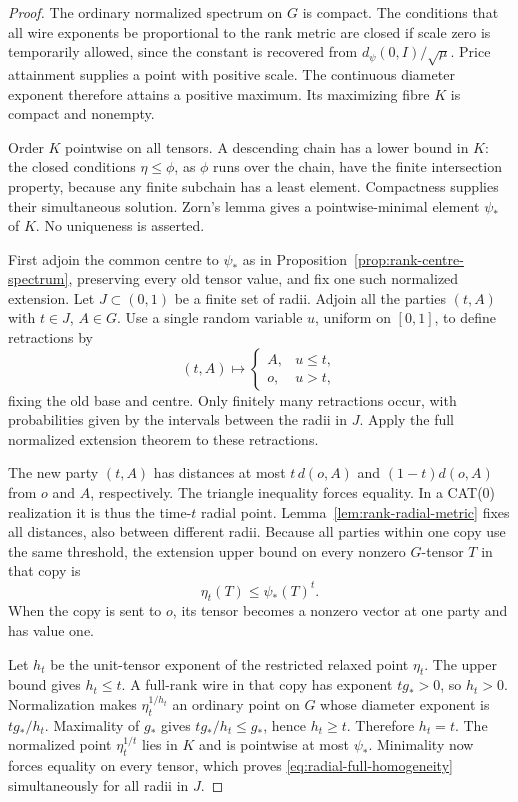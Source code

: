 \begin{proof}
The ordinary normalized spectrum on $G$ is compact. The conditions
that all wire exponents be proportional to the rank metric are
closed if scale zero is temporarily allowed, since the constant is recovered from
$d_\psi(0,I)/\sqrt\mu$. Price attainment supplies a point with
positive scale. The continuous diameter exponent therefore attains
a positive maximum. Its maximizing fibre $K$ is compact and
nonempty.

Order $K$ pointwise on all tensors. A descending chain has a lower
bound in $K$: the closed conditions $\eta\le\phi$, as $\phi$
runs over the chain, have the finite intersection property, because
any finite subchain has a least element. Compactness supplies their
simultaneous solution. Zorn's lemma gives a pointwise-minimal
element $\psi_*$ of $K$. No uniqueness is asserted.

First adjoin the common centre to $\psi_*$ as in
Proposition~\ref{prop:rank-centre-spectrum}, preserving every old
tensor value, and fix one such normalized extension.
Let $J\subset(0,1)$ be a finite set of radii. Adjoin all the parties
$(t,A)$ with $t\in J$, $A\in G$. Use a single random variable
$u$, uniform on $[0,1]$, to define retractions by
\[
 (t,A)\longmapsto
 \begin{cases}A,&u\le t,\\o,&u>t,\end{cases}
\]
fixing the old base and centre. Only finitely many retractions occur,
with probabilities given by the intervals between the radii in $J$.
Apply the full normalized extension theorem to these retractions.

The new party $(t,A)$ has distances at most $t\,d(o,A)$ and
$(1-t)d(o,A)$ from $o$ and $A$, respectively. The triangle
inequality forces equality. In a CAT(0) realization it is thus
the time-$t$ radial point. Lemma~\ref{lem:rank-radial-metric}
fixes all distances, also between different radii.
Because all parties within one copy use the same threshold, the
extension upper bound on every nonzero $G$-tensor $T$ in that copy is
\[
 \eta_t(T)\le\psi_*(T)^t.
\]
When the copy is sent to $o$, its tensor becomes a nonzero vector
at one party and has value one.

Let $h_t$ be the unit-tensor exponent of the restricted relaxed
point $\eta_t$. The upper bound gives $h_t\le t$.
A full-rank wire in that copy has exponent $tg_*>0$, so $h_t>0$.
Normalization makes $\eta_t^{1/h_t}$ an ordinary point on $G$
whose diameter exponent is $tg_*/h_t$. Maximality of $g_*$ gives
$tg_*/h_t\le g_*$, hence $h_t\ge t$. Therefore $h_t=t$.
The normalized point $\eta_t^{1/t}$ lies in $K$ and is pointwise
at most $\psi_*$. Minimality now forces equality on every tensor,
which proves \eqref{eq:radial-full-homogeneity} simultaneously for
all radii in $J$.


\end{proof}

